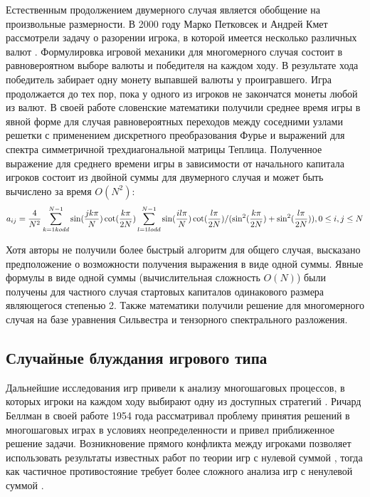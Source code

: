 Естественным продолжением двумерного случая является обобщение на произвольные размерности. В 2000 году Марко Петковсек и Андрей Кмет рассмотрели задачу о разорении игрока, в которой имеется несколько различных валют \cite{kmet_gamblers_2002}. Формулировка игровой механики для многомерного случая состоит в равновероятном выборе валюты и победителя на каждом ходу. В результате хода победитель забирает одну монету выпавшей валюты у проигравшего. Игра продолжается до тех пор, пока у одного из игроков не закончатся монеты любой из валют. В своей работе словенские математики получили среднее время игры в явной форме для случая равновероятных переходов между соседними узлами решетки с применением дискретного преобразования Фурье и выражений для спектра симметричной трехдиагональной матрицы Теплица. Полученное выражение для среднего времени игры в зависимости от начального капитала игроков состоит из двойной суммы для двумерного случая и может быть вычислено за время $O(N^2)$: 
\begin{equation}
    \label{eq:eq7}
    a_{ij} = \frac{4}{N^2} \sum_{k=1\\ k odd}^{N - 1} \sin(\frac{jk\pi}{N})\cot(\frac{k\pi}{2N}) \\
    \sum_{l=1\\ l odd}^{N - 1} \sin(\frac{il\pi}{N})\cot(\frac{l\pi}{2N})/(\sin^2(\frac{k\pi}{2N})+\sin^2(\frac{l\pi}{2N})), \\
    0 \leq i, j \leq N
\end{equation}

Хотя авторы не получили более быстрый алгоритм для общего случая, высказано предположение о возможности получения выражения в виде одной суммы. Явные формулы в виде одной суммы (вычислительная сложность $O(N)$) были получены для частного случая стартовых капиталов одинакового размера являющегося степенью 2. Также математики получили решение для многомерного случая на базе уравнения Сильвестра и тензорного спектрального разложения.

\subsection{Случайные блуждания игрового типа}\label{subsec:ch1/sec3/sub2}

Дальнейшие исследования игр привели к анализу многошаговых процессов, в которых игроки на каждом ходу выбирают одну из доступных стратегий \cite{bellman_decision_1954}. Ричард Беллман в своей работе 1954 года рассматривал проблему принятия решений в многошаговых играх в условиях неопределенности \cite{bellman_decision-making_1954} и привел приближенное решение задачи. Возникновение прямого конфликта между игроками позволяет использовать результаты известных работ по теории игр с нулевой суммой \cite{nash_non-cooperative_1951}, тогда как частичное противостояние требует более сложного анализа игр с ненулевой суммой \cite{bellman_non-zero_1949}. 

